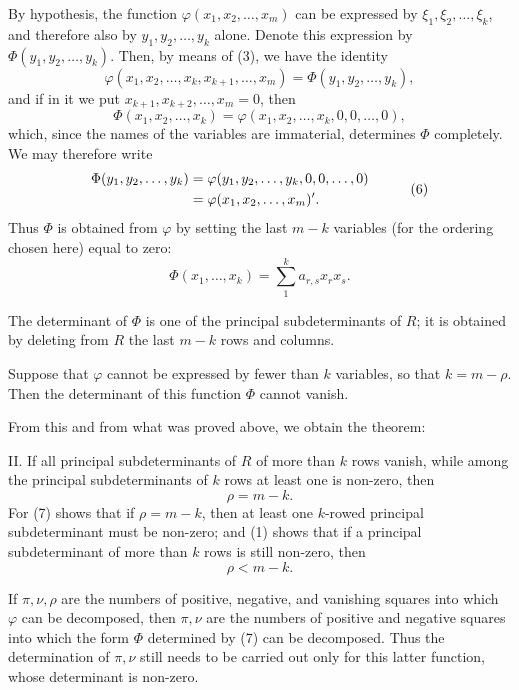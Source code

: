\documentclass[11pt]{article}
\begin{document}
By hypothesis, the function $\varphi(x_1,x_2,\ldots,x_m)$ can be expressed by $\xi_1,\xi_2,\ldots,\xi_k$, and therefore also by $y_1,y_2,\ldots,y_k$ alone. Denote this expression by $\Phi(y_1,y_2,\ldots,y_k)$. Then, by means of (3), we have the identity
\begin{equation}
        \varphi(x_1,x_2,\ldots,x_k,x_{k+1},\ldots,x_m)=\Phi(y_1,y_2,\ldots,y_k),
\tag{4}
\end{equation}
and if in it we put $x_{k+1},x_{k+2},\ldots,x_m=0$, then
\begin{equation}
        \Phi(x_1,x_2,\ldots,x_k)=\varphi(x_1,x_2,\ldots,x_k,0,0,\ldots,0),
\tag{5}
\end{equation}
which, since the names of the variables are immaterial, determines $\Phi$ completely. We may therefore write
\begin{equation}
\begin{aligned}
        \Phi(y_1,y_2,\ldots,y_k)&=\varphi(y_1,y_2,\ldots,y_k,0,0,\ldots,0)\cr
        &=\varphi(x_1,x_2,\ldots,x_m)'.
\end{aligned}
\tag{6}
\end{equation}
Thus $\Phi$ is obtained from $\varphi$ by setting the last $m-k$ variables (for the ordering chosen here) equal to zero:
\begin{equation}
        \Phi(x_1,\ldots,x_k)=\sum_{1}^{k}a_{r,s}x_rx_s.
\tag{7}
\end{equation}

The determinant of $\Phi$ is one of the principal subdeterminants of $R$; it is obtained by deleting from $R$ the last $m-k$ rows and columns.

Suppose that $\varphi$ cannot be expressed by fewer than $k$ variables, so that $k=m-\rho$. Then the determinant of this function $\Phi$ cannot vanish.

From this and from what was proved above, we obtain the theorem:

II. If all principal subdeterminants of $R$ of more than $k$ rows vanish, while among the principal subdeterminants of $k$ rows at least one is non-zero, then
\[
        \rho=m-k.
\]
For (7) shows that if $\rho=m-k$, then at least one $k$-rowed principal subdeterminant must be non-zero; and (1) shows that if a principal subdeterminant of more than $k$ rows is still non-zero, then
\[
        \rho<m-k.
\]

If $\pi,\nu,\rho$ are the numbers of positive, negative, and vanishing squares into which $\varphi$ can be decomposed, then $\pi,\nu$ are the numbers of positive and negative squares into which the form $\Phi$ determined by (7) can be decomposed. Thus the determination of $\pi,\nu$ still needs to be carried out only for this latter function, whose determinant is non-zero.
\end{document}

